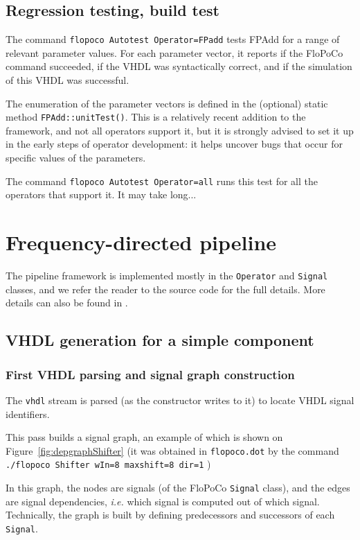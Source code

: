 \documentclass{article}
\begin{document}
\subsection{Regression testing, build test }
The command \verb!flopoco Autotest Operator=FPadd! tests FPAdd for a range of relevant parameter values.
For each parameter vector, it reports if the FloPoCo command succeeded, if the VHDL was syntactically correct, and if the simulation of this VHDL was successful.

The enumeration of the parameter vectors is defined in the (optional) static method \texttt{FPAdd::unitTest()}.
This is a relatively recent addition to the framework, and not all operators support it, but it is strongly advised to set it up in the early steps of operator development: it helps uncover bugs that occur for specific values of the parameters.

The command \verb!flopoco Autotest Operator=all! runs this test for all the operators that support it.
It may take long...




\section{Frequency-directed pipeline \label{sec:pipeline}}

The  pipeline framework  is implemented mostly in the \texttt{Operator} and \texttt{Signal} classes, and we refer the reader to the source code for the full  details.
More details can also be found in \cite{istoan:hal-01373937}.

\subsection{VHDL generation for a simple component}

\subsubsection{First VHDL parsing and signal graph construction}
The \texttt{vhdl} stream is parsed (as the constructor writes to it) to locate VHDL signal identifiers.

This pass builds  a signal graph, an example of which is shown on Figure~\ref{fig:depgraphShifter} 
(it was obtained in \texttt{flopoco.dot} by the command
\verb!./flopoco Shifter wIn=8 maxshift=8 dir=1! )

In this graph, the nodes are signals (of the FloPoCo \texttt{Signal} class), and the edges are signal dependencies, \emph{i.e.} which signal is computed out of which signal.
Technically, the graph is built by defining predecessors and successors of each \texttt{Signal}.
\end{document}
